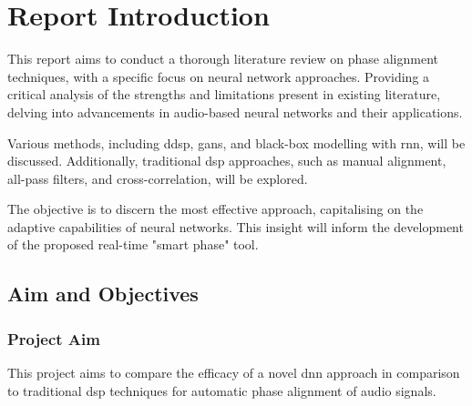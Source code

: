 \section{Report Introduction}

    This report aims to conduct a thorough literature review on phase alignment techniques, with a specific focus on neural network approaches. Providing a critical analysis of the strengths and limitations present in existing literature, delving into advancements in audio-based neural networks and their applications.
    
    Various methods, including \acrfull{ddsp}, \acrfull{gan}s, and black-box modelling with \acrfull{rnn}, will be discussed. Additionally, traditional \acrfull{dsp} approaches, such as manual alignment, all-pass filters, and cross-correlation, will be explored.
    
    The objective is to discern the most effective approach, capitalising on the adaptive capabilities of neural networks. This insight will inform the development of the proposed real-time "smart phase" tool.

    \subsection{Aim and Objectives}

        \subsubsection{Project Aim}	
            This project aims to compare the efficacy of a novel \acrfull{dnn} approach in comparison to traditional \acrshort{dsp} techniques for automatic phase alignment of audio signals.

